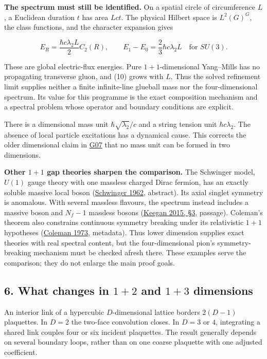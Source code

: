 \documentclass[11pt,a4paper]{article}
\begin{document}
\textbf{The spectrum must still be identified.} On a spatial circle of
circumference \(L\), a Euclidean duration \(t\) has area \(Lct\). The
physical Hilbert space is \(L^2(G)^G\), the class functions, and the
character expansion gives

\[E_R=\frac{\hbar c\lambda_2L}{2}C_2(R),\qquad
E_1-E_0=\frac23\hbar c\lambda_2L\quad\text{for }SU(3). \tag{10}\]

These are global electric-flux energies. Pure \(1+1\)-dimensional
Yang--Mills has no propagating transverse gluon, and (10) grows with
\(L\). Thus the solved refinement limit supplies neither a finite
infinite-line glueball mass nor the four-dimensional spectrum. Its value
for this programme is the exact composition mechanism and a spectral
problem whose operator and boundary conditions are explicit.

There is a dimensional mass unit \(\hbar\sqrt{\lambda_2}/c\) and a
string tension unit \(\hbar c\lambda_2\). The absence of local particle
excitations has a dynamical cause. This corrects the older dimensional
claim in \href{low-dimensional-mass-gap.md}{G07} that no mass unit can
be formed in two dimensions.

\textbf{Other \(1+1\) gap theories sharpen the comparison.} The
Schwinger model, \(U(1)\) gauge theory with one massless charged Dirac
fermion, has an exactly soluble massive local boson
(\href{https://doi.org/10.1103/PhysRev.128.2425}{Schwinger 1962},
abstract). Its axial singlet symmetry is anomalous. With several
massless flavours, the spectrum instead includes a massive boson and
\(N_f-1\) massless bosons
(\href{https://arxiv.org/pdf/1508.01685}{Keegan 2015, §3}, passage).
Coleman's theorem also constrains continuous symmetry breaking under its
relativistic \(1+1\) hypotheses
(\href{https://doi.org/10.1007/BF01646487}{Coleman 1973}, metadata).
Thus lower dimension supplies exact theories with real spectral content,
but the four-dimensional pion's symmetry-breaking mechanism must be
checked afresh there. These examples serve the comparison; they do not
enlarge the main proof goals.

\hypertarget{what-changes-in-12-and-13-dimensions}{%
\subsection{\texorpdfstring{6. What changes in \(1+2\) and \(1+3\)
dimensions}{6. What changes in 1+2 and 1+3 dimensions}}\label{what-changes-in-12-and-13-dimensions}}

An interior link of a hypercubic \(D\)-dimensional lattice borders
\(2(D-1)\) plaquettes. In \(D=2\) the two-face convolution closes. In
\(D=3\) or \(4\), integrating a shared link couples four or six incident
plaquettes. The result generally depends on several boundary loops,
rather than on one coarse plaquette with one adjusted coefficient.
\end{document}
